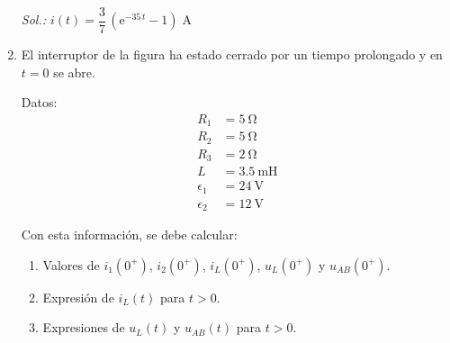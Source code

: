 \begin{enumerate}
    \vspace*{-7mm}
  \emph{Sol.:\; $i(t)=\dfrac{3}{7}\,(\mathrm{e}^{-35\,t}-1) \;\si{\ampere}$}
  

\item El interruptor de la figura ha estado cerrado por un tiempo
  prolongado y en $t = 0$ se abre.

\begin{minipage}{0.5\linewidth}
\end{minipage}
\begin{minipage}{0.5\linewidth}
  \hspace{20mm} Datos:
  \begin{align*}
    R_1 &= \SI{5}{\ohm}\\
    R_2 &= \SI{5}{\ohm}\\
    R_3 &= \SI{2}{\ohm}\\
    L &= \SI{3.5}{\milli\henry}\\
    \epsilon_1 &= \SI{24}{\volt}\\
    \epsilon_2 &= \SI{12}{\volt}
  \end{align*}
\end{minipage}

\medskip

Con esta información, se debe calcular:
\begin{enumerate}
\item Valores de $i_1(0^+)$, $i_2(0^+)$, $i_L(0^+)$, $u_L(0^+)$ y
  $u_{AB}(0^+)$.
\item Expresión de $i_L(t)$ para $t > 0$.
\item Expresiones de $u_L(t)$ y $u_{AB}(t)$ para $t > 0$.
\end{enumerate}


\end{enumerate}
